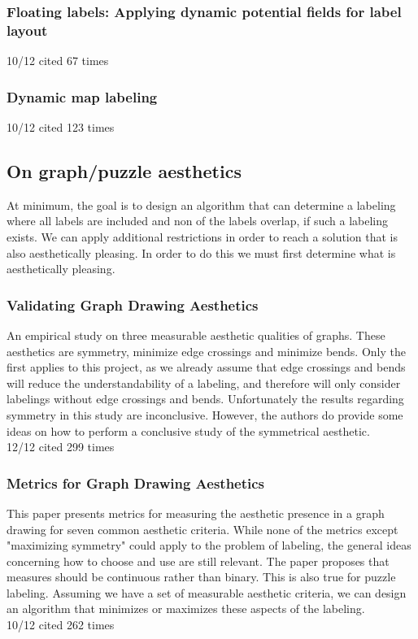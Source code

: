 \documentclass[a4paper]{article}
\begin{document}
\subsubsection{Floating labels: Applying dynamic potential fields for label layout \cite{hartmann2004floating}}
10/12 cited 67 times

\subsubsection{Dynamic map labeling \cite{been2006dynamic}}
10/12 cited 123 times

\subsection{On graph/puzzle aesthetics}
At minimum, the goal is to design an algorithm that can determine a labeling where all labels are included and non of the labels overlap, if such a labeling exists. We can apply additional restrictions in order to reach a solution that is also aesthetically pleasing. In order to do this we must first determine what is aesthetically pleasing.\\

\subsubsection{Validating Graph Drawing Aesthetics \cite{purchase1995validating}}
An empirical study on three measurable aesthetic qualities of graphs. These aesthetics are symmetry, minimize edge crossings and minimize bends. Only the first applies to this project, as we already assume that edge crossings and bends will reduce the understandability of a labeling, and therefore will only consider labelings without edge crossings and bends. Unfortunately the results regarding symmetry in this study are inconclusive. However, the authors do provide some ideas on how to perform a conclusive study of the symmetrical aesthetic.\\
12/12 cited 299 times
\subsubsection{Metrics for Graph Drawing Aesthetics \cite{purchase2002metrics}}
This paper presents metrics for measuring the aesthetic presence in a graph drawing for seven common aesthetic criteria. While none of the metrics except "maximizing symmetry" could apply to the problem of labeling, the general ideas concerning how to choose and use are still relevant. The paper proposes that measures should be continuous rather than binary. This is also true for puzzle labeling. Assuming we have a set of measurable aesthetic criteria, we can design an algorithm that minimizes or maximizes these aspects of the labeling.\\
10/12 cited 262 times
\end{document}
